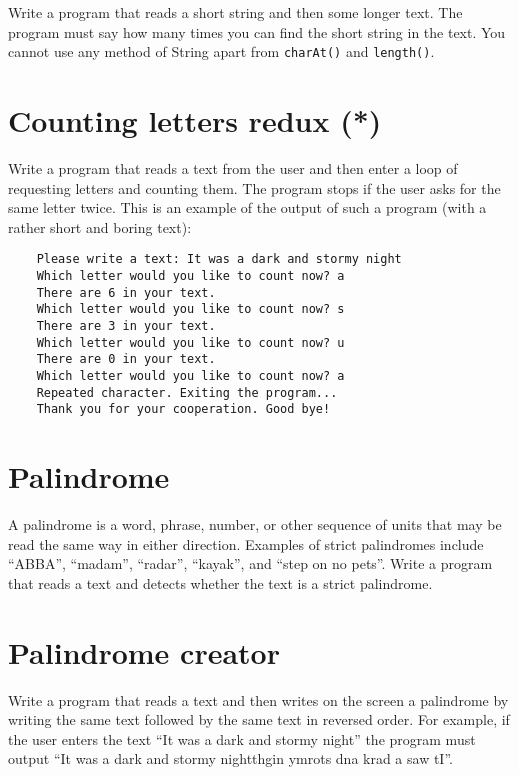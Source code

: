 \documentclass{article}
\begin{document}
Write a program that reads a short string and then some longer
text. The program must say how many times you can find the short string in the
text. You cannot use any method of String apart from \verb+charAt()+
and \verb+length()+. 

\section{Counting letters redux (*)}
\label{sec:count-lett-redux}

Write a program that reads a text from the user and then enter a loop
of requesting letters and counting them. The program stops if the user
asks for the same letter twice. This is an example of the output of
such a program (with a rather short and boring text): 

\begin{verbatim}
    Please write a text: It was a dark and stormy night
    Which letter would you like to count now? a
    There are 6 in your text. 
    Which letter would you like to count now? s
    There are 3 in your text. 
    Which letter would you like to count now? u
    There are 0 in your text. 
    Which letter would you like to count now? a
    Repeated character. Exiting the program...
    Thank you for your cooperation. Good bye!
\end{verbatim}

\section{Palindrome}
\label{sec:palindrome}

A palindrome is a word, phrase, number, or other sequence of units
that may be read the same way in either direction. Examples of strict
palindromes include ``ABBA'', ``madam'', ``radar'', ``kayak'', and
``step on no pets''. Write a program
that reads a text and detects whether the text is a strict palindrome.

\section{Palindrome creator}
\label{sec:palindrome-creator}

Write a program that reads a text and then writes on the screen a
palindrome by writing the same text followed by the same text in
reversed order. For example, if the user enters the text ``It was a
dark and stormy night'' the program must output ``It was a dark and
stormy nightthgin ymrots dna krad a saw tI''. 
\end{document}
